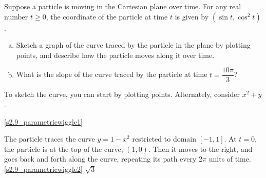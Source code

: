 \begin{question}
Suppose a particle is moving in the Cartesian plane over time. For any real number $t \geq 0$, the coordinate of the particle at time $t$ is given by $(\sin t, \cos^2 t)$.
\begin{enumerate}[(a)]
\item\label{s2.9_parametricwiggle1} Sketch a graph of the curve traced by the particle in the plane by plotting points, and describe how the particle moves along it over time.
\item\label{s2.9_parametricwiggle2} What is the slope of the curve traced by the particle at time $t=\dfrac{10\pi}{3}$?
\end{enumerate}
\end{question}
\begin{hint} To sketch the curve, you can start by plotting points. Alternately, consider $x^2+y$.
\end{hint}
\begin{answer}
\eqref{s2.9_parametricwiggle1}

\begin{center}\end{center}

The particle traces the curve $y=1-x^2$ restricted to domain $[-1,1]$. At $t=0$, the particle is at the top of the curve, $(1,0)$. Then it moves to the right, and goes back and forth along the curve, repeating its path every $2\pi$ units of time.\\

\eqref{s2.9_parametricwiggle2} $\sqrt{3}$
\end{answer}
